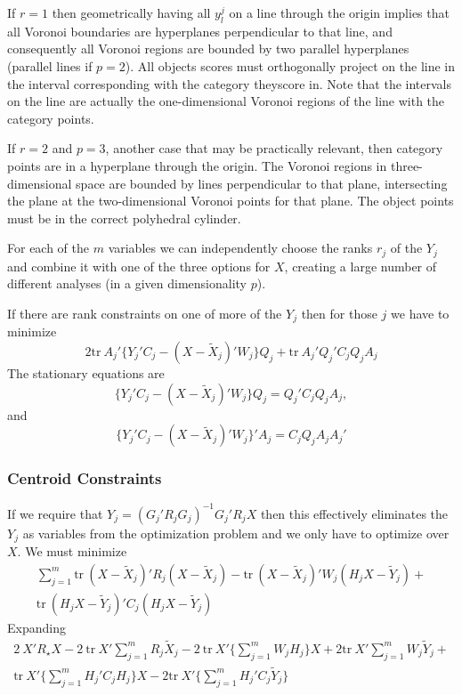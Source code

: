 \documentclass[
  12pt,
  letterpaper,
  DIV=11,
  numbers=noendperiod]{scrartcl}
\begin{document}
If \(r=1\) then geometrically having all \(y_l^j\) on a line through the
origin implies that all Voronoi boundaries are hyperplanes perpendicular
to that line, and consequently all Voronoi regions are bounded by two
parallel hyperplanes (parallel lines if \(p=2\)). All objects scores
must orthogonally project on the line in the interval corresponding with
the category theyscore in. Note that the intervals on the line are
actually the one-dimensional Voronoi regions of the line with the
category points.

If \(r=2\) and \(p=3\), another case that may be practically relevant,
then category points are in a hyperplane through the origin. The Voronoi
regions in three-dimensional space are bounded by lines perpendicular to
that plane, intersecting the plane at the two-dimensional Voronoi points
for that plane. The object points must be in the correct polyhedral
cylinder.

For each of the \(m\) variables we can independently choose the ranks
\(r_j\) of the \(Y_j\) and combine it with one of the three options for
\(X\), creating a large number of different analyses (in a given
dimensionality \(p\)).

If there are rank constraints on one of more of the \(Y_j\) then for
those \(j\) we have to minimize \[
2\text{tr}\ A_j'\{Y_j'C_j-(X-\tilde X_j)'W_j\}Q_j+
\text{tr}\ A_j'Q_j'C_jQ_jA_j
\] The stationary equations are \[
\{Y_j'C_j-(X-\tilde X_j)'W_j\}Q_j=Q_j'C_jQ_jA_j,
\] and \[
\{Y_j'C_j-(X-\tilde X_j)'W_j\}'A_j=C_jQ_jA_jA_j'
\]

\subsubsection{Centroid Constraints}\label{centroid-constraints}

If we require that \(Y_j=(G_j'R_jG_j)^{-1}G_j'R_jX\) then this
effectively eliminates the \(Y_j\) as variables from the optimization
problem and we only have to optimize over \(X\). We must minimize
\begin{multline}
\sum_{j=1}^m\text{tr}\ (X-\tilde X_j)'R_j(X-\tilde X_j) -
\text{tr}\ (X-\tilde X_j)'W_j(H_jX-\tilde Y_j)+\\
\text{tr}\ (H_jX-\tilde Y_j)'C_j(H_jX-\tilde Y_j)
\end{multline} Expanding \begin{multline}
2\ X'R_\star X-2\ \text{tr}\ X'\sum_{j=1}^mR_j\tilde X_j-2\ \text{tr}\ X'\{\sum_{j=1}^mW_jH_j\}X + 2\text{tr}\ X'\sum_{j=1}^mW_j\tilde Y_j+\\
\text{tr}\ X'\{\sum_{j=1}^mH_j'C_jH_j\}X-2\text{tr}\ X'\{\sum_{j=1}^mH_j'C_j\tilde Y_j\}
\end{multline}
\end{document}
